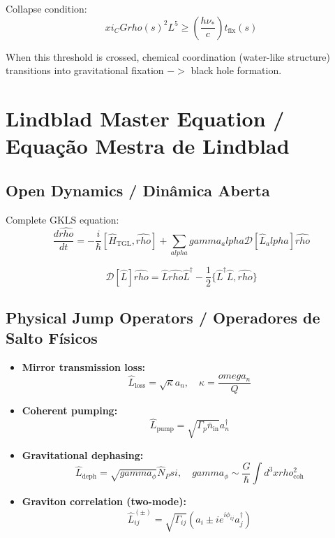 \documentclass[12pt,a4paper]{article}
\def\Psi{Psi}%
\def\to{ -> }%
\def\alpha{alpha}%
\def\gamma{gamma}%
\def\xi{xi}%
\def\rho{rho}%
\def\omega{omega}%
\begin{document}
Collapse condition:
\begin{equation}
\xi_C G\rho(s)^2 L^5 \geq \left(\frac{h\nu_*}{c}\right)t_{\text{fix}}(s)
\end{equation}

When this threshold is crossed, chemical coordination (water-like structure) transitions into gravitational fixation $\to$ black hole formation.

\section{Lindblad Master Equation / Equação Mestra de Lindblad}

\subsection{Open Dynamics / Dinâmica Aberta}

Complete GKLS equation:
\begin{equation}
\boxed{
\frac{d\hat{\rho}}{dt} = -\frac{i}{\hbar}[\hat{H}_{\text{TGL}}, \hat{\rho}] + \sum_{\alpha} \gamma_\alpha \mathcal{D}[\hat{L}_\alpha]\hat{\rho}
}
\end{equation}

\begin{equation}
\mathcal{D}[\hat{L}]\hat{\rho} = \hat{L}\hat{\rho}\hat{L}^\dagger - \frac{1}{2}\{\hat{L}^\dagger\hat{L}, \hat{\rho}\}
\end{equation}

\subsection{Physical Jump Operators / Operadores de Salto Físicos}

\begin{itemize}
    \item \textbf{Mirror transmission loss:}
    \begin{equation}
    \hat{L}_{\text{loss}} = \sqrt{\kappa}a_n, \quad \kappa = \frac{\omega_n}{Q}
    \end{equation}
    
    \item \textbf{Coherent pumping:}
    \begin{equation}
    \hat{L}_{\text{pump}} = \sqrt{\Gamma_p \bar{n}_{\text{in}}}a_n^\dagger
    \end{equation}
    
    \item \textbf{Gravitational dephasing:}
    \begin{equation}
    \hat{L}_{\text{deph}} = \sqrt{\gamma_\phi}\hat{N}_\Psi, \quad \gamma_\phi \sim \frac{G}{\hbar}\int d^3x \rho_{\text{coh}}^2
    \end{equation}
    
    \item \textbf{Graviton correlation (two-mode):}
    \begin{equation}
    \hat{L}_{ij}^{(\pm)} = \sqrt{\Gamma_{ij}}\left(a_i \pm ie^{i\phi_{ij}}a_j^\dagger\right)
    \end{equation}
\end{itemize}
\end{document}
